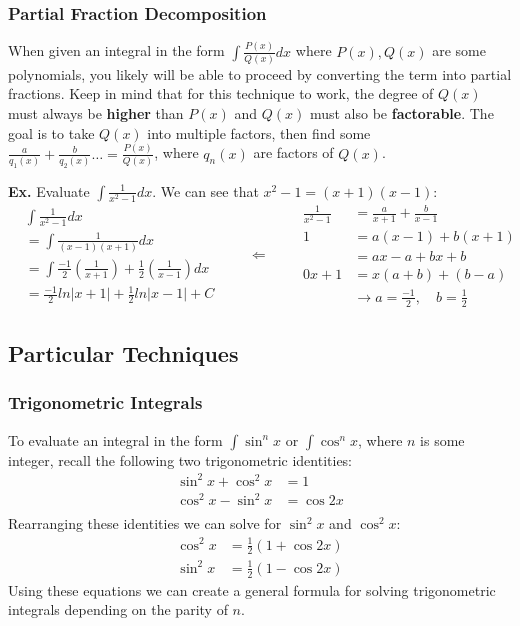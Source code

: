 \documentclass[a4paper]{article}
\begin{document}
  \subsubsection{Partial Fraction Decomposition}
  When given an integral in the form $\int \frac{P(x)}{Q(x)}dx$ where $P(x),Q(x)$ are some polynomials, you likely will be able to proceed by converting the term into partial fractions. Keep in mind that for this technique to work, the degree of $Q(x)$ must always be \textbf{higher} than $P(x)$ and $Q(x)$ must also be \textbf{factorable}.
  The goal is to take $Q(x)$ into multiple factors, then find some $\frac{a }{q_1(x)} + \frac{b }{q_2(x)} \dots = \frac{P(x)}{Q(x)}$, where $q_n(x)$ are factors of $Q(x)$.

  \textbf{Ex.} Evaluate $\int \frac{1 }{x^2-1} dx$. We can see that $x^2-1 = (x+1)(x-1)$:
  \begin{equation*}
    \begin{aligned}
      & \int \frac{1 }{x^2-1} dx\\
      &= \int \frac{1 }{(x-1)(x+1)} dx\\
      &= \int \frac{-1 }{2} (\frac{1 }{x+1}) + \frac{1 }{2}(\frac{1 }{x-1}) dx \\
      &= \frac{-1 }{2} ln|x+1| + \frac{1 }{2} ln|x-1| + C
    \end{aligned}
    \qquad \Leftarrow \qquad
    \begin{aligned}
      \frac{1 }{x^2-1} &=\frac{a }{x+1} + \frac{b }{x-1} \\
                     1 &=a(x-1) + b(x+1)\\
                       &= ax - a + bx + b \\
       0x + 1                &= x(a+b) + (b-a) \\ 
                       &\rightarrow a = \frac{-1 }{2}, \quad b = \frac{1 }{2}
    \end{aligned}
  \end{equation*}
  \subsection{Particular Techniques}
  \subsubsection{Trigonometric Integrals}
  To evaluate an integral in the form $\int \sin^n x$ or $\int \cos^n x$, where $n$ is some integer, recall the following two trigonometric identities:
  \[
    \begin{split}
      \sin^2 x + \cos^2 x &= 1 \\
      \cos^2 x - \sin^2 x &= \cos 2x \\
    \end{split}
  \]
  Rearranging these identities we can solve for $\sin^2 x$ and $\cos^2 x$:
  \[
    \begin{split}
      \cos^2 x &= \frac{1 }{2} (1+\cos 2x) \\
      \sin^2 x &= \frac{1 }{2} (1-\cos 2x)
    \end{split}
  \]
  Using these equations we can create a general formula for solving trigonometric integrals depending on the parity of $n$.
\end{document}
